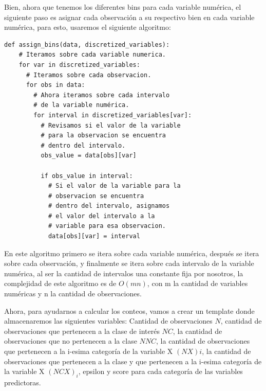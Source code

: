 \documentclass[
 12pt,
 letterpaper,
]{article}
\theoremstyle{teoremaBreak}
\theoremstyle{plain}
\theoremstyle{definition}
\begin{document}
Bien, ahora que tenemos los diferentes bins para cada variable numérica, el siguiente paso es asignar cada 
observación a su respectivo bien en cada variable numérica, para esto, usaremos el siguiente algoritmo:

\begin{lstlisting}[style=pseudocodigo]  
  def assign_bins(data, discretized_variables):
    # Iteramos sobre cada variable numerica.
    for var in discretized_variables:
      # Iteramos sobre cada observacion.
      for obs in data:
        # Ahora iteramos sobre cada intervalo 
        # de la variable numérica.
        for interval in discretized_variables[var]:
          # Revisamos si el valor de la variable 
          # para la observacion se encuentra
          # dentro del intervalo.
          obs_value = data[obs][var]
          
          if obs_value in interval:
            # Si el valor de la variable para la 
            # observacion se encuentra 
            # dentro del intervalo, asignamos 
            # el valor del intervalo a la 
            # variable para esa observacion.
            data[obs][var] = interval

\end{lstlisting}

En este algoritmo primero se itera sobre cada variable numérica, después se itera sobre cada observación, y 
finalmente se itera sobre cada intervalo de la variable numérica, al ser la cantidad de intervalos una 
constante fija por nosotros, la complejidad de este algoritmo es de $O(mn)$, con m la cantidad de variables 
numéricas y n la cantidad de observaciones.

Ahora, para ayudarnos a calcular los conteos, vamos a crear un template donde almacenaremos las siguientes 
variables: Cantidad de observaciones $N$, cantidad de observaciones que pertenecen a la clase de interés $NC$, 
la cantidad de observaciones que no pertenecen a la clase $NNC$, la cantidad de observaciones que pertenecen 
a la i-esima categoría de la variable X $(NX){i}$, la cantidad de observaciones que pertenecen a la clase y 
que pertenecen a la i-esima categoría de la variable X $(NCX)_{i}$, epsilon y score para cada categoría de las 
variables predictoras.
\end{document}

